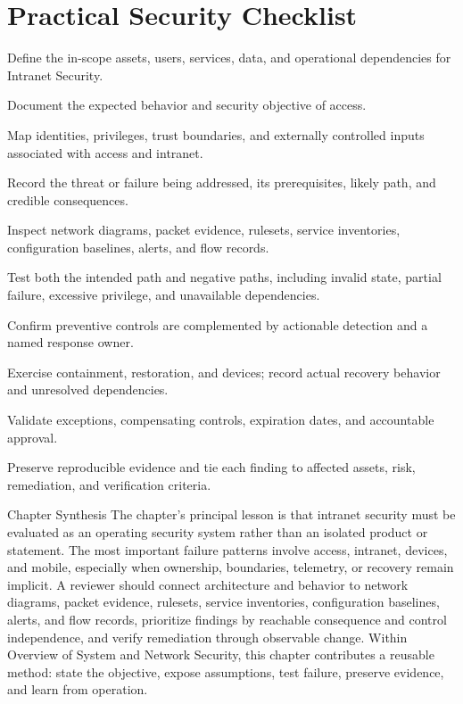 \documentclass[11pt,letterpaper]{article}
\begin{document}
\section*{Practical Security Checklist}
\begin{CornellChecklist}
\item Define the in-scope assets, users, services, data, and operational dependencies for Intranet Security.
\item Document the expected behavior and security objective of access.
\item Map identities, privileges, trust boundaries, and externally controlled inputs associated with access and intranet.
\item Record the threat or failure being addressed, its prerequisites, likely path, and credible consequences.
\item Inspect network diagrams, packet evidence, rulesets, service inventories, configuration baselines, alerts, and flow records.
\item Test both the intended path and negative paths, including invalid state, partial failure, excessive privilege, and unavailable dependencies.
\item Confirm preventive controls are complemented by actionable detection and a named response owner.
\item Exercise containment, restoration, and devices; record actual recovery behavior and unresolved dependencies.
\item Validate exceptions, compensating controls, expiration dates, and accountable approval.
\item Preserve reproducible evidence and tie each finding to affected assets, risk, remediation, and verification criteria.
\end{CornellChecklist}
\begin{CornellSummaryBox}{Chapter Synthesis}
The chapter's principal lesson is that intranet security must be evaluated as an operating security system rather than an isolated product or statement. The most important failure patterns involve access, intranet, devices, and mobile, especially when ownership, boundaries, telemetry, or recovery remain implicit. A reviewer should connect architecture and behavior to network diagrams, packet evidence, rulesets, service inventories, configuration baselines, alerts, and flow records, prioritize findings by reachable consequence and control independence, and verify remediation through observable change. Within Overview of System and Network Security, this chapter contributes a reusable method: state the objective, expose assumptions, test failure, preserve evidence, and learn from operation.
\end{CornellSummaryBox}
\end{document}
